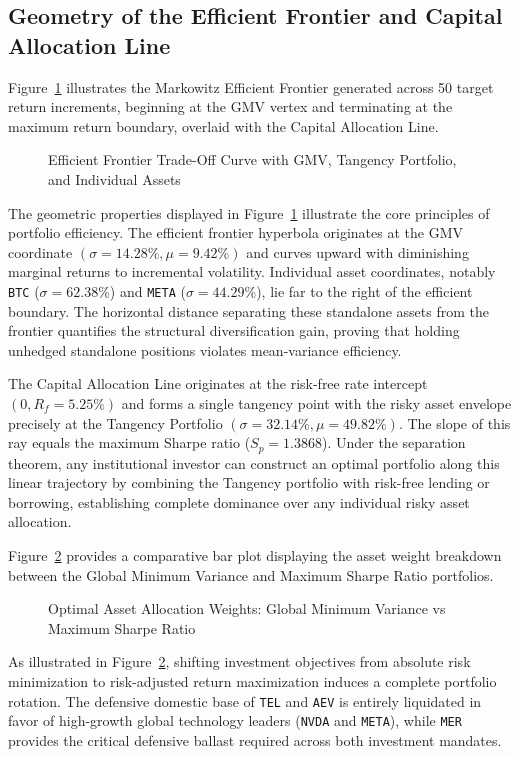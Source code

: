 \subsection{Geometry of the Efficient Frontier and Capital Allocation Line}

Figure~\ref{fig:efficient_frontier} illustrates the Markowitz Efficient Frontier generated across 50 target return increments, beginning at the GMV vertex and terminating at the maximum return boundary, overlaid with the Capital Allocation Line.

\begin{figure}[H]
  \centering
  \caption{Efficient Frontier Trade-Off Curve with GMV, Tangency Portfolio, and Individual Assets}
  \label{fig:efficient_frontier}
\end{figure}

The geometric properties displayed in Figure~\ref{fig:efficient_frontier} illustrate the core principles of portfolio efficiency. The efficient frontier hyperbola originates at the GMV coordinate $(\sigma = 14.28\%, \mu = 9.42\%)$ and curves upward with diminishing marginal returns to incremental volatility. Individual asset coordinates, notably \texttt{BTC} ($\sigma = 62.38\%$) and \texttt{META} ($\sigma = 44.29\%$), lie far to the right of the efficient boundary. The horizontal distance separating these standalone assets from the frontier quantifies the structural diversification gain, proving that holding unhedged standalone positions violates mean-variance efficiency.

The Capital Allocation Line originates at the risk-free rate intercept $(0, R_f = 5.25\%)$ and forms a single tangency point with the risky asset envelope precisely at the Tangency Portfolio $(\sigma = 32.14\%, \mu = 49.82\%)$. The slope of this ray equals the maximum Sharpe ratio ($S_p = 1.3868$). Under the separation theorem, any institutional investor can construct an optimal portfolio along this linear trajectory by combining the Tangency portfolio with risk-free lending or borrowing, establishing complete dominance over any individual risky asset allocation.

Figure~\ref{fig:portfolio_allocation} provides a comparative bar plot displaying the asset weight breakdown between the Global Minimum Variance and Maximum Sharpe Ratio portfolios.

\begin{figure}[H]
  \centering
  \caption{Optimal Asset Allocation Weights: Global Minimum Variance vs Maximum Sharpe Ratio}
  \label{fig:portfolio_allocation}
\end{figure}

As illustrated in Figure~\ref{fig:portfolio_allocation}, shifting investment objectives from absolute risk minimization to risk-adjusted return maximization induces a complete portfolio rotation. The defensive domestic base of \texttt{TEL} and \texttt{AEV} is entirely liquidated in favor of high-growth global technology leaders (\texttt{NVDA} and \texttt{META}), while \texttt{MER} provides the critical defensive ballast required across both investment mandates.
